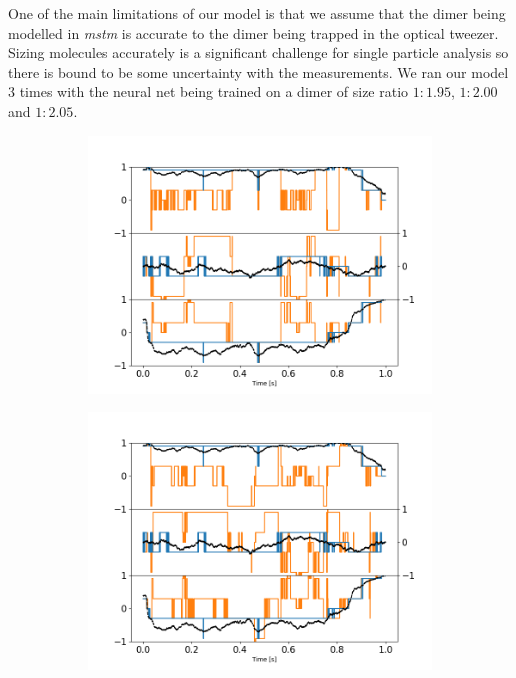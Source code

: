 One of the main limitations of our model is that we assume that 
the dimer being modelled in \textit{mstm} is accurate to the 
dimer being trapped in the optical tweezer. Sizing molecules 
accurately is a significant challenge for single particle 
analysis so there is bound to be some uncertainty with the 
measurements. We ran our model 3 times with the neural net being 
trained on a dimer of size ratio $1:1.95$, $1:2.00$ and $1:2.05$.
\begin{figure}[h!]
	\centering
	\begin{subfigure}{0.33\textwidth}
		\subcaption{}
		\includegraphics[width =\textwidth]{fig8a.png}
	\end{subfigure}
	\begin{subfigure}{0.31\textwidth}
		\subcaption{}
		\includegraphics[width=\textwidth]{fig8b.png}

\end{subfigure}
\end{figure}
